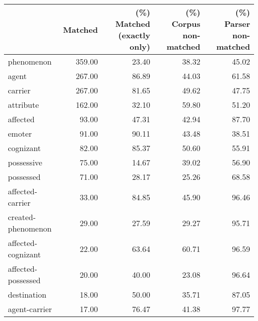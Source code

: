 \begin{table}[!ht]
\centering
\begin{tabular}{lrrrr}
\toprule
{} &  Matched &  (\%) Matched (exactly only) &  (\%) Corpus non-matched &  (\%) Parser non-matched \\
\midrule
phenomenon           &   359.00 &                       23.40 &                   38.32 &                   45.02 \\
agent                &   267.00 &                       86.89 &                   44.03 &                   61.58 \\
carrier              &   267.00 &                       81.65 &                   49.62 &                   47.75 \\
attribute            &   162.00 &                       32.10 &                   59.80 &                   51.20 \\
affected             &    93.00 &                       47.31 &                   42.94 &                   87.70 \\
emoter               &    91.00 &                       90.11 &                   43.48 &                   38.51 \\
cognizant            &    82.00 &                       85.37 &                   50.60 &                   55.91 \\
possessive           &    75.00 &                       14.67 &                   39.02 &                   56.90 \\
possessed            &    71.00 &                       28.17 &                   25.26 &                   68.58 \\
affected-carrier     &    33.00 &                       84.85 &                   45.90 &                   96.46 \\
created-phenomenon   &    29.00 &                       27.59 &                   29.27 &                   95.71 \\
affected-cognizant   &    22.00 &                       63.64 &                   60.71 &                   96.59 \\
affected-possessed   &    20.00 &                       40.00 &                   23.08 &                   96.64 \\
destination          &    18.00 &                       50.00 &                   35.71 &                   87.05 \\
agent-carrier        &    17.00 &                       76.47 &                   41.38 &                   97.77 \\

\end{tabular}
\end{table}

